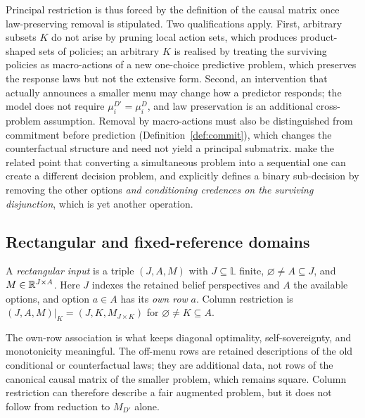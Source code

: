 Principal restriction is thus forced by the definition of the causal matrix once law-preserving
removal is stipulated. Two qualifications apply. First, arbitrary subsets $K$ do not arise by pruning
local action sets, which produces product-shaped sets of policies; an arbitrary $K$ is realised by
treating the surviving policies as macro-actions of a new one-choice predictive problem, which
preserves the response laws but not the extensive form. Second, an intervention that actually
announces a smaller menu may change how a predictor responds; the model does not require
$\mu^{D'}_i=\mu^{D}_i$, and law preservation is an additional cross-problem assumption. Removal by
macro-actions must also be distinguished from commitment before prediction
(Definition~\ref{def:commit}), which changes the counterfactual structure and need not yield a
principal submatrix. \textcite{spencerwells2019} make the related point that converting a
simultaneous problem into a sequential one can create a different decision problem, and
\textcite{gallow2026} explicitly defines a binary sub-decision by removing the other options
\emph{and conditioning credences on the surviving disjunction}, which is yet another operation.

\subsection{Rectangular and fixed-reference domains}

\begin{definition}\label{def:rect}
A \emph{rectangular input} is a triple $(J,A,M)$ with $J\subseteq\mathbb L$ finite, $\varnothing\neq A\subseteq J$,
and $M\in\mathbb{R}^{J\times A}$. Here $J$ indexes the retained belief perspectives and $A$ the available
options, and option $a\in A$ has its \emph{own row} $a$. Column restriction is
$(J,A,M)|_K=(J,K,M_{J\times K})$ for $\varnothing\neq K\subseteq A$.
\end{definition}

The own-row association is what keeps diagonal optimality, self-sovereignty, and monotonicity
meaningful. The off-menu rows are retained descriptions of the old conditional or counterfactual
laws; they are additional data, not rows of the canonical causal matrix of the smaller problem,
which remains square. Column restriction can therefore describe a fair augmented problem, but it does
not follow from reduction to $M_{D'}$ alone.

